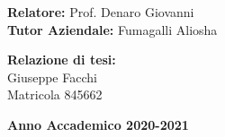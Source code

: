 \documentclass[a4paper,12pt,openright,oneside]{book}
\begin{document}
\begin{titlepage}
	\vspace{50mm}
	
	\noindent
	{\large \textbf{Relatore:} Prof. Denaro Giovanni } \\
	
	\noindent
	{\large \textbf{Tutor Aziendale:} Fumagalli Aliosha}
	
	\vspace{15mm}
	
	\begin{flushright}
		{\large \textbf{Relazione di tesi:}} \\
		\large{Giuseppe Facchi} \\
		\large{Matricola 845662} 
	\end{flushright}
	
	\vspace{20mm}
	\begin{center}
		{\large{\bf Anno Accademico 2020-2021}}
	\end{center}
	
	\restoregeometry
	
\end{titlepage}

%





\cleardoublepage
\tableofcontents






\backmatter



\end{document}
